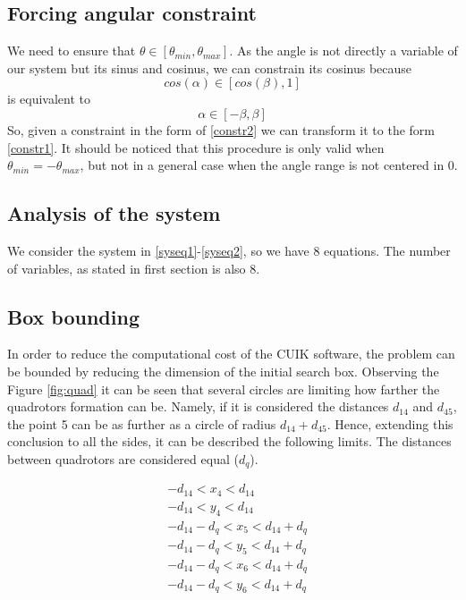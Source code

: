 \documentclass[paper=a4, fontsize=11pt]{scrartcl} %
\begin{document}
\subsection*{Forcing angular constraint}
We need to ensure that $\theta \in [\theta_{min}, \theta_{max}]$. As the angle is not directly a variable of our system but its sinus and cosinus, we can constrain its cosinus because 
\begin{equation}
\label{constr1}
cos(\alpha) \in [cos(\beta), 1]
\end{equation}
is equivalent to
\begin{equation}
\label{constr2}
\alpha \in [-\beta, \beta]
\end{equation}
So, given a constraint in the form of \ref{constr2} we can transform it to the form \ref{constr1}. It should be noticed that this procedure is only valid when $\theta_{min}=-\theta_{max}$, but not in a general case when the angle range is not centered in 0.

\subsection*{Analysis of the system}
We consider the system in \ref{syseq1}-\ref{syseq2}, so we have 8 equations. The number of variables, as stated in first section is also 8.

\subsection*{Box bounding}
In order to reduce the computational cost of the CUIK software, the problem can be bounded by reducing the dimension of the initial search box. Observing the Figure \ref{fig:quad} it can be seen that several circles are limiting how farther the quadrotors formation can be. Namely, if it is considered the distances $d_{14}$ and $d_{45}$, the point 5 can be as further as a circle of radius $d_{14}+d_{45}$. Hence, extending this conclusion to all the sides, it can be described the following limits. The distances between quadrotors are considered equal ($d_q$).

\begin{align}
&-d_{14}<x_4<d_{14} \\
&-d_{14}<y_4<d_{14} \\
&-d_{14}-d_q<x_5<d_{14}+d_q \\
&-d_{14}-d_q<y_5<d_{14}+d_q \\
&-d_{14}-d_q<x_6<d_{14}+d_q \\
&-d_{14}-d_q<y_6<d_{14}+d_q
\end{align}
\end{document}
